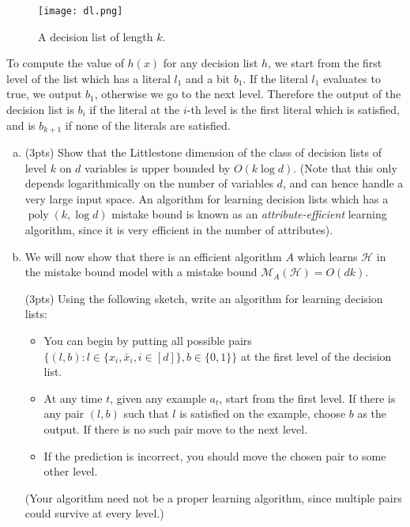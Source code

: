 \documentclass[11pt]{article}
\DeclareMathOperator{\poly}{poly}
\newcommand{\calH}{{\mathcal{H}}}
\newcommand{\calM}{{\mathcal{M}}}
\newcommand{\blue}[1]{{\color{blue}#1}}
\begin{document}
\begin{figure}[h]
    \centering
    \texttt{[image: dl.png]}
    \caption{A decision list of length $k$.}
    \label{fig:dl}
\end{figure}

To compute the value of $h(x)$ for any decision list $h$, we start from the first level of the list which has a literal $l_1$ and a bit $b_1$. If the literal $l_1$ evaluates to true, we output $b_1$, otherwise we go to the next level. Therefore the output of the decision list is $b_i$ if the literal at the $i$-th level is the first literal which is satisfied, and is $b_{k+1}$ if none of the literals are satisfied.

\begin{enumerate}[(a)]
    \item (\blue{3pts}) Show that the Littlestone dimension of the class of decision lists of level $k$ on $d$ variables is upper bounded by $O(k\log d)$. (Note that this only depends logarithmically on the number of variables $d$, and can hence handle a very large input space. An algorithm for learning decision lists which has a $\poly(k, \log d)$ mistake bound is known as an \emph{attribute-efficient} learning algorithm, since it is very efficient in the number of attributes).
    \item We will now show that there is an efficient algorithm $A$ which learns $\calH$ in the mistake bound model with a mistake bound $\calM_A(\calH)=O(dk)$. 
    
    (\blue{3pts}) Using the following sketch, write an algorithm for learning decision lists: 
    \begin{itemize}
        \item You can begin by putting all possible pairs $\{(l,b):l \in \{x_i,\bar{x}_i, i\in [d]\}, b \in \{0,1\}\}$ at the first level of the decision list.
        \item At any time $t$, given any example $a_t$, start from the first level. If there is any pair $(l,b)$ such that $l$ is satisfied on the example, choose $b$ as the output. If there is no such pair move to the next level. 
        \item If the prediction is incorrect, you should move the chosen pair to some other level.
    \end{itemize}
    
    (Your algorithm need not be a proper learning algorithm, since multiple pairs could survive at every level.)
    

\end{enumerate}
\end{document}
